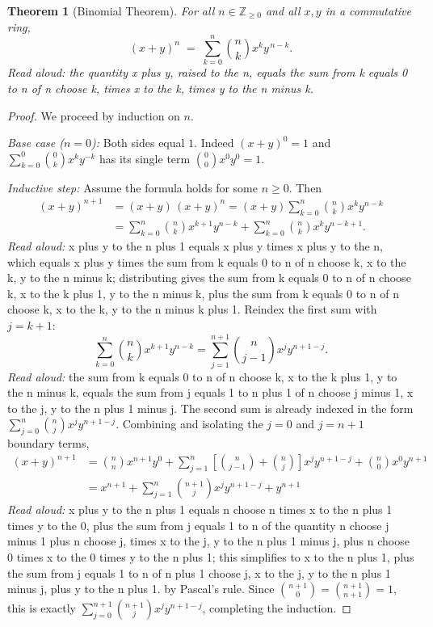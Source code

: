 \documentclass[11pt]{article}
\newtheorem{theorem}{Theorem}
\theoremstyle{definition}
\theoremstyle{remark}
\begin{document}
\begin{theorem}[Binomial Theorem]\label{thm:binomial}
For all $n \in \mathbb{Z}_{\geq 0}$ and all $x,y$ in a commutative ring,
\[
  (x+y)^n \;=\; \sum_{k=0}^{n} \binom{n}{k} x^{k} y^{\,n-k}.
\]
\emph{Read aloud:} the quantity x plus y, raised to the n, equals the
sum from k equals 0 to n of n choose k, times x to the k, times y to
the n minus k.
\end{theorem}

\begin{proof}
We proceed by induction on $n$.

\emph{Base case ($n=0$):} Both sides equal $1$. Indeed
$(x+y)^0 = 1$ and $\sum_{k=0}^{0}\binom{0}{k}x^k y^{-k}$ has its single
term $\binom{0}{0}x^0 y^0 = 1$.

\emph{Inductive step:} Assume the formula holds for some $n \geq 0$. Then
\begin{align*}
(x+y)^{n+1}
  &= (x+y)\,(x+y)^n
  = (x+y)\sum_{k=0}^{n} \binom{n}{k} x^k y^{n-k} \\
  &= \sum_{k=0}^{n} \binom{n}{k} x^{k+1} y^{n-k}
   + \sum_{k=0}^{n} \binom{n}{k} x^{k} y^{n-k+1}.
\end{align*}
\emph{Read aloud:} x plus y to the n plus 1 equals x plus y times x plus
y to the n, which equals x plus y times the sum from k equals 0 to n of
n choose k, x to the k, y to the n minus k; distributing gives the sum
from k equals 0 to n of n choose k, x to the k plus 1, y to the n minus
k, plus the sum from k equals 0 to n of n choose k, x to the k, y to the
n minus k plus 1.
Reindex the first sum with $j = k+1$:
\[
  \sum_{k=0}^{n} \binom{n}{k} x^{k+1} y^{n-k}
  = \sum_{j=1}^{n+1} \binom{n}{j-1} x^{j} y^{n+1-j}.
\]
\emph{Read aloud:} the sum from k equals 0 to n of n choose k, x to the
k plus 1, y to the n minus k, equals the sum from j equals 1 to n plus
1 of n choose j minus 1, x to the j, y to the n plus 1 minus j.
The second sum is already indexed in the form $\sum_{j=0}^{n}
\binom{n}{j} x^{j} y^{n+1-j}$. Combining and isolating the $j=0$ and
$j=n+1$ boundary terms,
\begin{align*}
(x+y)^{n+1}
  &= \binom{n}{n} x^{n+1} y^{0}
   + \sum_{j=1}^{n} \left[\binom{n}{j-1} + \binom{n}{j}\right] x^j y^{n+1-j}
   + \binom{n}{0} x^0 y^{n+1} \\
  &= x^{n+1}
   + \sum_{j=1}^{n} \binom{n+1}{j} x^j y^{n+1-j}
   + y^{n+1}
\end{align*}
\emph{Read aloud:} x plus y to the n plus 1 equals n choose n times x to
the n plus 1 times y to the 0, plus the sum from j equals 1 to n of the
quantity n choose j minus 1 plus n choose j, times x to the j, y to the
n plus 1 minus j, plus n choose 0 times x to the 0 times y to the n plus
1; this simplifies to x to the n plus 1, plus the sum from j equals 1 to
n of n plus 1 choose j, x to the j, y to the n plus 1 minus j, plus y to
the n plus 1.
by Pascal's rule. Since $\binom{n+1}{0} = \binom{n+1}{n+1} = 1$, this is
exactly $\sum_{j=0}^{n+1} \binom{n+1}{j} x^j y^{n+1-j}$, completing the
induction.
\end{proof}
\end{document}
